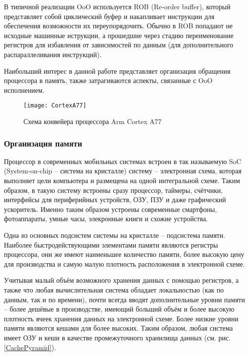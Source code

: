     В типичной реализации OoO используется ROB (Re-order buffer), который представляет собой
    циклический буфер и накапливает инструкции для обеспечения возможности их переупорядочить.
    Обычно в ROB попадают не исходные машинные иструкции, а прошедшие через стадию переименование
    регистров для избавления от зависимостей по данным (для дополнительного распараллеливания
    инструкций).

    Наибольший интерес в данной работе представляет организация обращения процессора в память,
    также затрагиваются аспекты, связанные с OoO исполнением.

    \begin{figure}[!h]
        \caption{Схема конвейера процессора Arm Cortex A77 \cite{CortexA77Docs}}
        \centering
        \texttt{[image: CortexA77]}
        \label{cortexA77}
    \end{figure}

\subsubsection{Организация памяти}

    Процессор в современных мобильных системах встроен в так называемую SoC (System-on-chip --
    система на кристалле) систему -- электронная схема, которая выполняет цели компьютера
    и размещена на одной интегральной схеме. Таким образом, в такую систему встроены сразу процессор,
    таймеры, счётчики, интерфейсы для периферийных устройств, ОЗУ, ПЗУ и даже графический ускоритель.
    Именно таким образом устроены современные
    смартфоны, фотоаппараты, умные часы, элекронные книги и схожие устройства.

    Одна из основных подсистем системы на кристалле -- подсистема памяти. Наиболее быстродействующими
    элементами памяти являются регистры процессора, они же имеют наименьшее количество памяти, более
    высокую цену для производства и самую малую плотность расположения в электронной схеме.

    Учитывая малый объём возможного хранения данных с помощью регистров, а также
    что любая вычислительная система обладает локальностью (как по данным, так и по
    времени), почти всегда вводят дополнительные уровни памяти -- более дешёвые в производстве,
    имеющий больший объём и более высокую плотность ячеек хранения данных на электронной схеме.
    Более низкие уровни памяти являются кешами для более высоких.
    Таким образом, любая система имеет ОЗУ и кеши в качестве промежуточного хранилища данных
    (см. рис. \ref{CachePyramid}).

